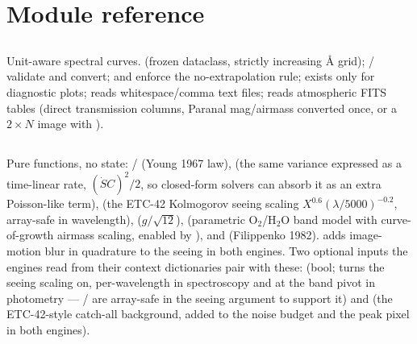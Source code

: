 \section{Module reference}
\label{sec:modules}

\subsection{}
Unit-aware spectral curves.  (frozen dataclass, strictly
increasing \AA{} grid); / validate and
convert;  and  enforce
the no-extrapolation rule;  exists only for
diagnostic plots;  reads whitespace/comma
text files;  reads atmospheric FITS
tables (direct transmission columns, Paranal 
mag/airmass converted once, or a $2\times N$ image with ).

\subsection{}
Pure functions, no state:  /
 (Young 1967 law),
 (the same variance expressed
as a time-linear rate, $(\dot S C)^2/2$, so closed-form solvers can absorb
it as an extra Poisson-like term),  (the
ETC-42 Kolmogorov seeing scaling $X^{0.6}(\lambda/5000)^{-0.2}$, array-safe
in wavelength),  ($g/\sqrt{12}$),
 (parametric O$_2$/H$_2$O band model with
curve-of-growth airmass scaling, enabled by
),
 and
 (Filippenko 1982).
 adds image-motion blur in
quadrature to the seeing in both engines. Two optional
inputs the engines read from their context dictionaries pair with these:
 (bool; turns the seeing
scaling on, per-wavelength in spectroscopy and at the band pivot in
photometry --- / are
array-safe in the seeing argument to support it) and
 (the ETC-42-style
catch-all background, added to the noise budget and the peak pixel in both
engines).

